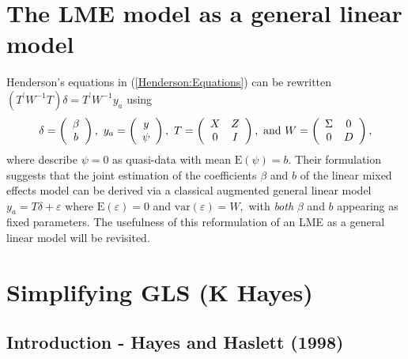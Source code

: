 \documentclass[Main.tex]{subfiles}
\begin{document}
\section{The LME model as a general linear model}
Henderson's equations in (\ref{Henderson:Equations}) can be rewritten $( T^\prime W^{-1} T ) \delta = T^\prime W^{-1} y_{a} $ using
\[
\delta = \left(\begin{array}{c}\beta \\ b \end{array}\right),
\ y_{a} = \left(\begin{array}{c}
y \cr \psi
\end{array}\right),
\ T = \left(\begin{array}{cc}
X & Z  \\
0 & I
\end{array}\right),
\ \textrm{and} \ W = \left(\begin{array}{cc}
\Sigma & 0  \cr
0 &  D \end{array}\right),
\]
where \cite{Lee:Neld:Pawi:2006} describe $\psi = 0$ as quasi-data with mean $\mathrm{E}(\psi) = b.$ Their formulation suggests that the joint estimation of the coefficients $\beta$ and $b$ of the linear mixed effects model can be derived via a classical augmented general linear model $y_{a} = T\delta + \varepsilon$ where $\mathrm{E}(\varepsilon) = 0$ and $\mathrm{var}(\varepsilon) = W,$ with \emph{both} $\beta$ and $b$ appearing as fixed parameters. The usefulness of this reformulation of an LME as a general linear model will be revisited.






\section{Simplifying GLS (K Hayes)}

\subsection{Introduction - Hayes and Haslett (1998)}
\end{document}
